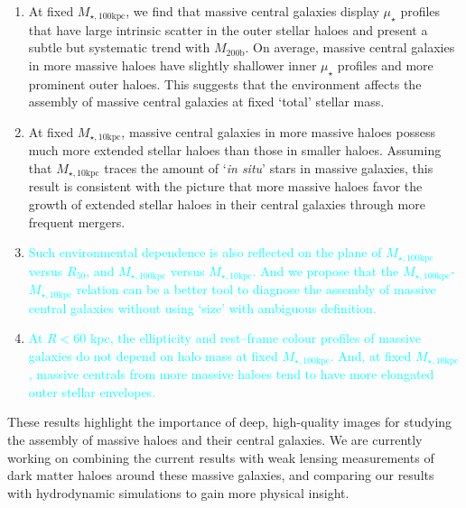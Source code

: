 \documentclass[a4paper,fleqn,usenatbib]{mnras}
\def\mhalo{{$M_{\mathrm{200b}}$}}
\def\minn{{$M_{\star,10\mathrm{kpc}}$}}
\def\mtot{{$M_{\star,100\mathrm{kpc}}$}}
\def\mden{{$\mu_{\star}$}}
\newcommand{\song}[1]{\textcolor{cyan}{#1}}
\begin{document}
    \begin{enumerate}
    
        \item At fixed \mtot{}, we find that massive central galaxies display \mden{} 
            profiles that have large intrinsic scatter in the outer stellar haloes and 
            present a subtle but systematic trend with \mhalo{}.
            On average, massive central galaxies in more massive haloes have slightly 
            shallower inner \mden{} profiles and more prominent outer haloes. 
            This suggests that the environment affects the assembly of massive central
            galaxies at fixed `total' stellar mass.
            
        \item At fixed \minn{}, massive central galaxies in more massive haloes 
            possess much more extended stellar haloes than those in smaller haloes. 
            Assuming that \minn{} traces the amount of `\textit{in situ}' stars in 
            massive galaxies, this result is consistent with the picture that more 
            massive haloes favor the growth of extended stellar haloes in their central 
            galaxies through more frequent mergers. 
        
        \item \song{
            Such environmental dependence is also reflected on the plane of
            \mtot{} versus $R_{\mathrm{50}}$, and \mtot{} versus \minn{}. 
            And we propose that the \mtot{}-\minn{} relation can be a better tool 
            to diagnose the assembly of massive central galaxies without using `size' 
            with ambiguous definition.
            }
                    
        \item \song{
            At $R < 60$ kpc, the ellipticity and rest--frame colour profiles of 
            massive galaxies do not depend on halo mass at fixed \mtot{}.
            And, at fixed \minn{}, massive centrals from more massive haloes tend 
            to have more elongated outer stellar envelopes.
            } 
             
    \end{enumerate}
    
    These results highlight the importance of deep, high-quality images for studying 
    the assembly of massive haloes and their central galaxies. 
    We are currently working on combining the current results with weak lensing 
    measurements of dark matter haloes around these massive galaxies, and comparing 
    our results with hydrodynamic simulations to gain more physical insight. 
\end{document}
